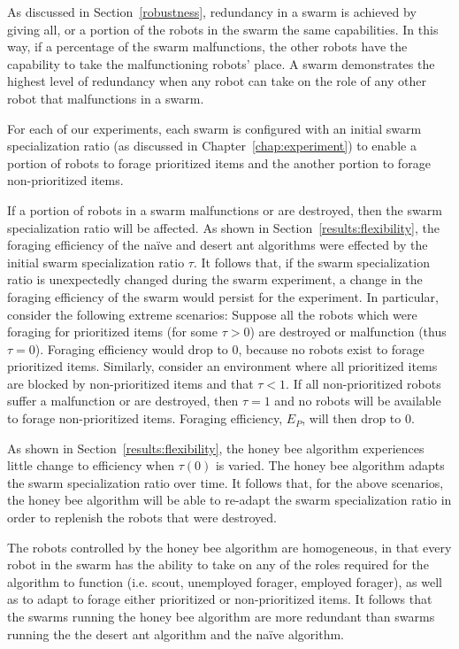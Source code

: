 As discussed in Section~\ref{robustness}, redundancy in a swarm is achieved by giving all, or a portion of the robots in the swarm the same capabilities. In this way, if a percentage of the swarm malfunctions, the other robots have the capability to take the malfunctioning robots' place. A swarm demonstrates the highest level of redundancy when any robot can take on the role of any other robot that malfunctions in a swarm. 

For each of our experiments, each swarm is configured with an initial swarm specialization ratio (as discussed in Chapter~\ref{chap:experiment}) to enable a portion of robots to forage prioritized items and the another portion to forage non-prioritized items. 

If a portion of robots in a swarm malfunctions or are destroyed, then the swarm specialization ratio will be affected. As shown in Section~\ref{results:flexibility}, the foraging efficiency of the na\"ive and desert ant algorithms were effected by the initial swarm specialization ratio $\tau$. It follows that, if the swarm specialization ratio is unexpectedly changed during the swarm experiment, a change in the foraging efficiency of the swarm would persist for the experiment. In particular, consider the following extreme scenarios: Suppose all the robots which were foraging for prioritized items (for some $\tau > 0$) are destroyed or malfunction (thus $\tau=0$). Foraging efficiency would drop to 0, because no robots exist to forage prioritized items. Similarly, consider an environment where all prioritized items are blocked by non-prioritized items and that $\tau < 1$. If all non-prioritized robots suffer a malfunction or are destroyed, then $\tau=1$ and no robots will be available to forage non-prioritized items. Foraging efficiency, $E_P$, will then drop to 0. 

As shown in Section~\ref{results:flexibility}, the honey bee algorithm experiences little change to efficiency when $\tau(0)$ is varied. The honey bee algorithm adapts the swarm specialization ratio  over time. It follows that, for the above scenarios, the honey bee algorithm will be able to re-adapt the swarm specialization ratio in order to replenish the robots that were destroyed. 

The robots controlled by the honey bee algorithm are homogeneous, in that every robot in the swarm has the ability to take on any of the roles required for the algorithm to function (i.e. scout, unemployed forager, employed forager), as well as to adapt to forage either prioritized or non-prioritized items. It follows that the swarms running the honey bee algorithm are more redundant than swarms running the the desert ant algorithm and the na\"ive algorithm.

